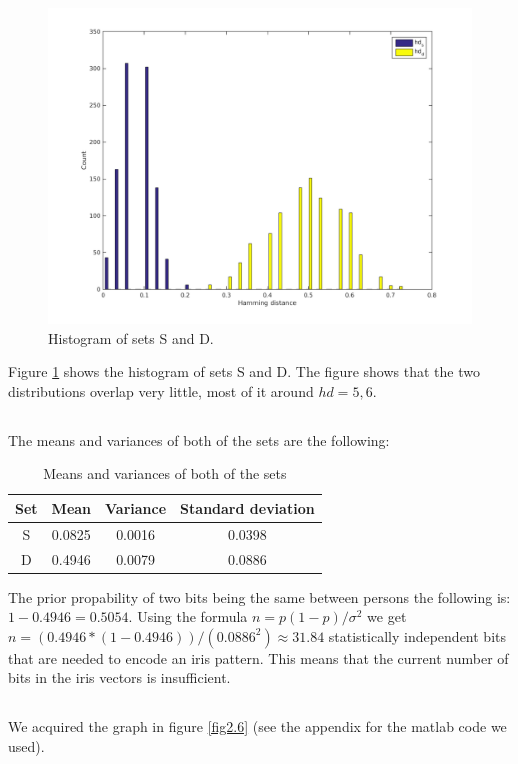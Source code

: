 \documentclass[10pt]{article}
\begin{document}
\subsection{}
\begin{figure}[H]
	\centering
	\includegraphics[width=.7\linewidth]{plot2_4.png}
	\caption{Histogram of sets S and D.}
	\label{fig2.4}
\end{figure}
Figure \ref{fig2.4} shows the histogram of sets S and D. The figure shows that the two distributions overlap very little, most of it around $hd = 5,6$.

\subsection{}
The means and variances of both of the sets are the following:
\begin{table}[H]
 \begin{tabular}{|c|c|c|c|}
  \hline
  Set & Mean & Variance & Standard deviation \\
  \hline
  S & 0.0825 & 0.0016 & 0.0398 \\
  \hline
  D & 0.4946 & 0.0079 & 0.0886 \\
  \hline
 \end{tabular}
 \caption{Means and variances of both of the sets}
 \label{tab2.5}
\end{table}
\noindent The prior propability of two bits being the same between persons the following is: $1-0.4946=0.5054$.
Using the formula $n=p(1-p)/\sigma^2$ we get $n=(0.4946*(1-0.4946))/(0.0886^2)\approx 31.84$ statistically independent bits that are needed to encode an iris pattern. This means that the current number of bits in the iris vectors is insufficient.

\subsection{}
We acquired the graph in figure \ref{fig2.6} (see the appendix for the matlab code we used).
\end{document}
